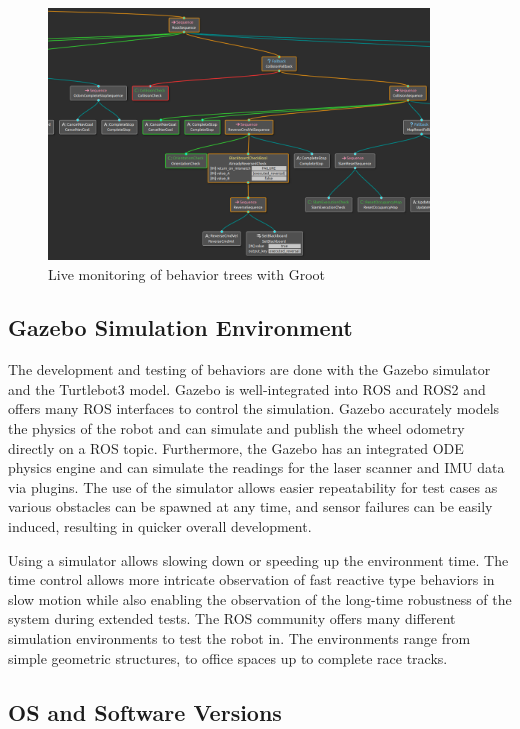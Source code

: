 \begin{figure}[ht]
	\centering 
	\includegraphics[width=0.9\textwidth]{images/groot.png}
	\caption{Live monitoring of behavior trees with Groot}
	\label{fig:groot}
\end{figure}


\subsection{Gazebo Simulation Environment}

The development and testing of behaviors are done with the Gazebo simulator and the Turtlebot3 model. Gazebo is well-integrated into ROS and ROS2 and offers many ROS interfaces to control the simulation. Gazebo accurately models the physics of the robot and can simulate and publish the wheel odometry directly on a ROS topic. Furthermore, the Gazebo has an integrated ODE physics engine and can simulate the readings for the laser scanner and IMU data via plugins. The use of the simulator allows easier repeatability for test cases as various obstacles can be spawned at any time, and sensor failures can be easily induced, resulting in quicker overall development.

Using a simulator allows slowing down or speeding up the environment time. The time control allows more intricate observation of fast reactive type behaviors in slow motion while also enabling the observation of the long-time robustness of the system during extended tests. The ROS community offers many different simulation environments to test the robot in. The environments range from simple geometric structures, to office spaces up to complete race tracks. 

\subsection{OS and Software Versions}

